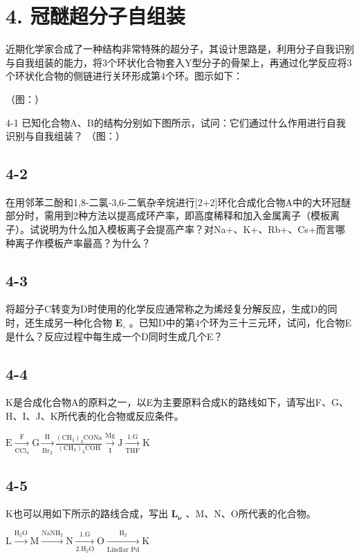 \section*{4. 冠醚超分子自组装}
近期化学家合成了⼀种结构⾮常特殊的超分⼦，其设计思路是，利⽤分⼦⾃我识别与⾃我组装的能⼒，将3个环状化合物套⼊Y型分⼦的⻣架上，再通过化学反应将3个环状化合物的侧链进⾏关环形成第4个环。图⽰如下：

（图：）

4-1 已知化合物A、B的结构分别如下图所⽰，试问：它们通过什么作⽤进⾏⾃我识别与⾃我组装？
（图：）

\subsection*{4-2}
在⽤邻苯⼆酚和1,8-⼆氯-3,6-⼆氧杂⾟烷进⾏[2+2]环化合成化合物A中的⼤环冠醚部分时，需⽤到2种⽅法以提⾼成环产率，即⾼度稀释和加⼊⾦属离⼦（模板离⼦）。试说明为什么加⼊模板离⼦会提⾼产率？对Na+、K+、Rb+、Cs+⽽⾔哪种离⼦作模板产率最⾼？为什么？

\subsection*{4-3}
将超分⼦C转变为D时使⽤的化学反应通常称之为烯烃复分解反应，⽣成D的同时，还⽣成另⼀种化合物 $\mathbf { E } _ { \circ }$ 。已知D中的第4个环为三⼗三元环，试问，化合物E是什么？反应过程中每⽣成⼀个D同时⽣成⼏个E？

\subsection*{4-4}
K是合成化合物A的原料之⼀，以E为主要原料合成K的路线如下，请写出F、G、H、I、J、K所代表的化合物或反应条件。

$
\mathrm{E} \xrightarrow [ \mathrm{CCl} _ {4} ]{\mathrm{F}} \mathrm{G} \xrightarrow [ \mathrm{Br} _ {2} ]{\mathrm{H}} \frac {(\mathrm{CH} _ {3}) _ {3} \mathrm{CONa}}{(\mathrm{CH} _ {3}) _ {3} \mathrm{COH}} \xrightarrow [ \mathrm{I} ]{\mathrm{Mg}} \mathrm{J} \xrightarrow [ \mathrm{THF} ]{1 . \mathrm{G}} \mathrm{K}
$

\subsection*{4-5}
K也可以⽤如下所⽰的路线合成，写出 $\mathbf { L } _ { \mathbf { \nu } }$ 、M、N、O所代表的化合物。

$
\mathrm{L} \xrightarrow {\mathrm{H} _ {2} \mathrm{O}} \mathrm{M} \xrightarrow {\mathrm{NaNH} _ {2}} \mathrm{N} \xrightarrow [ 2 . \mathrm{H} _ {2} \mathrm{O} ]{1 . \mathrm{G}} \mathrm{O} \xrightarrow [ \text {Lindlar Pd} ]{\mathrm{H} _ {2}} \mathrm{K}
$
